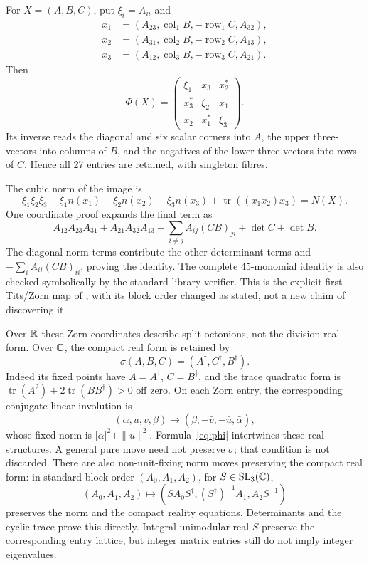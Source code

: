\documentclass[11pt,reqno]{amsart}
\theoremstyle{definition}\newtheorem{definition}[theorem]{Definition}
\theoremstyle{remark}\newtheorem{remark}[theorem]{Remark}
\DeclareMathOperator{\tr}{tr}\DeclareMathOperator{\Tr}{Tr}\DeclareMathOperator{\Ann}{Ann}\DeclareMathOperator{\Fix}{Fix}\DeclareMathOperator{\diag}{diag}\DeclareMathOperator{\lcm}{lcm}\DeclareMathOperator{\Ree}{Re}\DeclareMathOperator{\Jac}{Jac}\DeclareMathOperator{\Pic}{Pic}
\begin{document}
For $X=(A,B,C)$, put $\xi_i=A_{ii}$ and
\begin{align*}
 x_1&=(A_{23},\operatorname{col}_1B,-\operatorname{row}_1C,A_{32}),\\
 x_2&=(A_{31},\operatorname{col}_2B,-\operatorname{row}_2C,A_{13}),\\
 x_3&=(A_{12},\operatorname{col}_3B,-\operatorname{row}_3C,A_{21}).
\end{align*}
Then
\begin{equation}\label{eq:phi}
 \Phi(X)=\begin{pmatrix}\xi_1&x_3&x_2^*\\x_3^*&\xi_2&x_1\\x_2&x_1^*&\xi_3\end{pmatrix}.
\end{equation}
Its inverse reads the diagonal and six scalar corners into $A$, the upper
three-vectors into columns of $B$, and the negatives of the lower three-vectors
into rows of $C$. Hence all 27 entries are retained, with singleton fibres.

The cubic norm of the image is
\[
 \xi_1\xi_2\xi_3-\xi_1n(x_1)-\xi_2n(x_2)-\xi_3n(x_3)
 +\tr((x_1x_2)x_3)=N(X).
\]
One coordinate proof expands the final term as
\[
 A_{12}A_{23}A_{31}+A_{21}A_{32}A_{13}
 -\sum_{i\ne j}A_{ij}(CB)_{ji}+\det C+\det B.
\]
The diagonal-norm terms contribute the other determinant terms and
$-\sum_iA_{ii}(CB)_{ii}$, proving the identity. The complete 45-monomial
identity is also checked symbolically by the standard-library verifier. This
is the explicit first-Tits/Zorn map of \cite[Theorem~11 and Appendix A]{BP},
with its block order changed as stated, not a new claim of discovering it.

Over $\mathbb R$ these Zorn coordinates describe split octonions, not the division
real form. Over $\mathbb C$, the compact real form is retained by
\[
 \sigma(A,B,C)=(A^\dagger,C^\dagger,B^\dagger).
\]
Indeed its fixed points have $A=A^\dagger$, $C=B^\dagger$, and the trace
quadratic form is $\tr(A^2)+2\tr(BB^\dagger)>0$ off zero. On each Zorn entry,
the corresponding conjugate-linear involution is
\[
 (\alpha,u,v,\beta)\mapsto
 (\bar\beta,-\bar v,-\bar u,\bar\alpha),
\]
whose fixed norm is $|\alpha|^2+\|u\|^2$. Formula~\eqref{eq:phi} intertwines
these real structures. A general pure move need not preserve $\sigma$; that
condition is not discarded. There are also non-unit-fixing norm moves preserving
the compact real form: in standard block order $(A_0,A_1,A_2)$, for
$S\in\mathrm{SL}_3(\mathbb C)$,
\[
 (A_0,A_1,A_2)\mapsto
 (SA_0S^\dagger,(S^\dagger)^{-1}A_1,A_2S^{-1})
\]
preserves the norm and the compact reality equations. Determinants and the
cyclic trace prove this directly. Integral unimodular real $S$ preserve the
corresponding entry lattice, but integer matrix entries still do not imply
integer eigenvalues.
\end{document}
